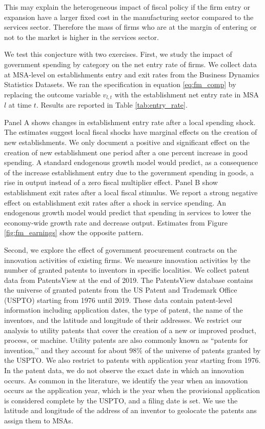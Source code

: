 \documentclass[dv_diss_main.tex]{subfiles}
\begin{document}
This may explain the heterogeneous impact of fiscal policy if the firm entry or expansion have a larger fixed cost in the manufacturing sector compared to the services sector. Therefore the mass of firms who are at the margin of entering or not to the market is higher in the services sector. 

We test this conjecture with two exercises. First, we study the impact of government spending by category on the net entry rate of firms. We collect data at MSA-level on establishments entry and exit rates from the Business Dynamics Statistics Datasets. We ran the specification in equation \eqref{eq:fm_comp} by replacing the outcome variable $v_{l,t}$ with the establishment net entry rate in MSA $l$ at time $t$. Results are reported in Table \ref{tab:entry_rate}. 

Panel A shows changes in establishment entry rate after a local spending shock. The estimates suggest local fiscal shocks have marginal effects on the creation of new establishments. We only document a positive and significant effect on the creation of new establishment one period after a one percent increase in good spending. A standard endogenous growth model would predict, as a consequence of the increase establishment entry due to the government spending in goods, a rise in output instead of a zero fiscal multiplier effect. Panel B show establishment exit rates after a local fiscal stimulus. We report a strong negative effect on establishment exit rates after a shock in service spending. An endogenous growth model would predict that spending in services to lower the economy-wide growth rate and decrease output. Estimates from Figure \ref{fig:fm_earnings} show the opposite pattern. 

Second, we explore the effect of government procurement contracts on the innovation activities of existing firms. We measure innovation activities by the number of granted patents to inventors in specific localities. We collect patent data from PatentsView at the end of 2019. The PatentsView database contains the universe of granted patents from the US Patent and Trademark Office (USPTO) starting from 1976 until 2019. These data contain patent-level information including application dates, the type of patent, the name of the inventors, and the latitude and longitude of their addresses. We restrict our analysis to utility patents that cover the creation of a new or improved product, process, or machine. Utility patents are also commonly known as ``patents for invention,’’ and they account for about $98\%$ of the universe of patents granted by the USPTO. We also restrict to patents with application year starting from 1976. In the patent data, we do not observe the exact date in which an innovation occurs. As common in the literature, we identify the year when an innovation occurs as the application year, which is the year when the provisional application is considered complete by the USPTO, and a filing date is set. We use the latitude and longitude of the address of an inventor to geolocate the patents ans assign them to MSAs.
\end{document}
